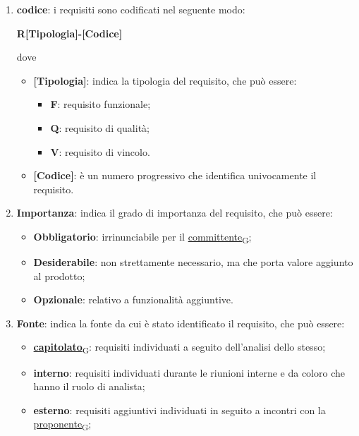 \begin{enumerate}
	\item \textbf{codice}: i requisiti sono codificati nel seguente modo:
	      \begin{center}
		      \textbf{R[Tipologia]-[Codice]}
	      \end{center}
	      dove
	      \begin{itemize}
			\item \textbf{[Tipologia]}: indica la tipologia del requisito, che può essere:
			\begin{itemize}
				\item \textbf{F}: requisito funzionale;
				\item \textbf{Q}: requisito di qualità;
				\item \textbf{V}: requisito di vincolo.
			\end{itemize}
			\item \textbf{[Codice]}: è un numero progressivo che identifica univocamente il requisito.
	      \end{itemize}
	\item \textbf{Importanza}: indica il grado di importanza del requisito, che può essere:
	      \begin{itemize}
		      \item \textbf{Obbligatorio}: irrinunciabile per il \href{https://7last.github.io/docs/rtb/documentazione-interna/glossario\#committente}{committente\textsubscript{G}};
		      \item \textbf{Desiderabile}: non strettamente necessario, ma che porta valore aggiunto al prodotto;
		      \item \textbf{Opzionale}: relativo a funzionalità aggiuntive.
	      \end{itemize}
	\item \textbf{Fonte}: indica la fonte da cui è stato identificato il requisito, che può essere:
	      \begin{itemize}
		      \item \href{https://7last.github.io/docs/rtb/documentazione-interna/glossario\#capitolato}{\textbf{capitolato}\textsubscript{G}}: requisiti individuati a seguito dell'analisi dello stesso;
		      \item \textbf{interno}: requisiti individuati durante le riunioni interne e da coloro che hanno il ruolo di analista;
		      \item \textbf{esterno}: requisiti aggiuntivi individuati in seguito a incontri con la \href{https://7last.github.io/docs/rtb/documentazione-interna/glossario\#proponente}{proponente\textsubscript{G}};

\end{itemize}
\end{enumerate}
